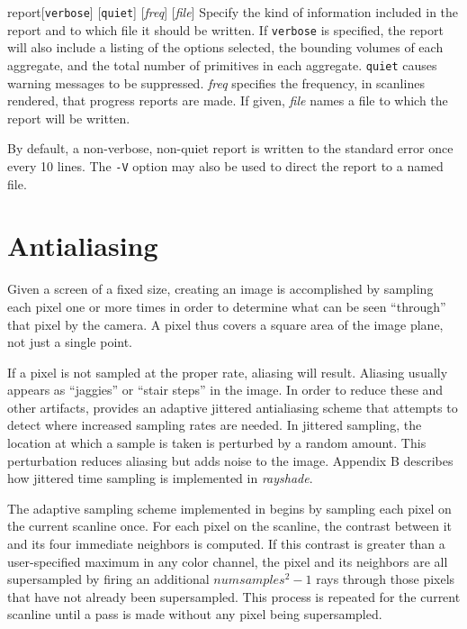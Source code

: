 \begin{defkey}{report}{[{\tt verbose}] [{\tt quiet}] [{\em freq}] [{\em file}]}
	Specify the kind of
	information included in the report and to which
	file it should be written.
	If {\tt verbose} is specified, the
	report will also include a listing of the options selected,
	the 
	bounding volumes of each aggregate,
	and the total number of primitives in each aggregate.
	{\tt quiet} causes warning
	messages to be suppressed.  {\em freq} specifies the frequency,
	in scanlines rendered, that progress reports are made.
	If given, {\em file} names a file to which the report
	will be written.
\end{defkey}
By default, a non-verbose, non-quiet report is 
written to the standard error once every 10 lines.
The {\tt -V} option may also be used to direct the report to a named file.

\section{Antialiasing}

Given a screen of a fixed size, creating an image is accomplished by
sampling each pixel one or more times in order to determine what can
be seen ``through'' that pixel by the camera.  A pixel thus covers
a square area of the image plane, not just a single point.

If a pixel is not sampled at the proper rate, aliasing will result.
Aliasing usually appears as ``jaggies'' or ``stair steps'' in the image.
In order to reduce these and other artifacts, \rayshade provides
an adaptive jittered antialiasing scheme that attempts to detect where
increased sampling rates are needed.
In jittered sampling, the location at which a sample is taken is
perturbed by a random amount.  This perturbation reduces aliasing
but adds noise to the image.  Appendix B describes how jittered
time sampling is implemented in {\em rayshade}.

The adaptive sampling scheme implemented in \rayshade begins
by sampling each pixel on the current scanline once.
For each pixel on the scanline, the contrast between it and its
four immediate neighbors is computed.  If this contrast is greater
than a user-specified maximum in any color channel,
the pixel and its
neighbors are all supersampled by firing an additional
{$numsamples^2 -1$} rays through those pixels that have not already been
supersampled.  This process is repeated for the current scanline
until a pass is made without any
pixel being supersampled.

